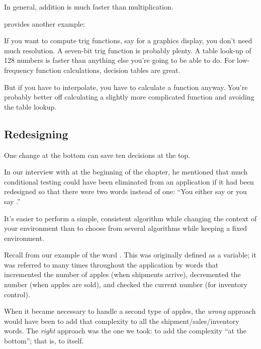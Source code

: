 In general, addition is much faster than multiplication.

\begin{interview}
 provides another example:
\begin{tfquot}
If you want to compute trig functions, say for a graphics display, you don't
need much resolution. A seven-bit trig function is probably plenty. A table
look-up of 128 numbers is faster than anything else you're going to be able
to do. For low-frequency function calculations, decision tables are great.

But if you have to interpolate, you have to calculate a function anyway.
You're probably better off calculating a slightly more complicated function
and avoiding the table lookup.
\end{tfquot}
\end{interview}%
%

\subsection{Redesigning}%
%

\begin{tip}
One change at the bottom can save ten decisions at the top.
\end{tip}
In our interview with  at the
beginning of the chapter, he mentioned that much conditional testing could
have been eliminated from an application if it had been redesigned so that
there were two words instead of one: ``You either say  or you
say .''

It's easier to perform a simple, consistent algorithm while changing
the context of your environment than to choose from several algorithms
while keeping a fixed environment.

Recall from  our example of the word . This was
originally defined as a variable; it was referred to many times throughout
the application by words that incremented the number of apples (when
shipments arrive), decremented the number (when apples are sold), and
checked the current number (for inventory control).

When it became necessary to handle a second type of apples, the
\emph{wrong} approach would have been to add that complexity to all
the shipment/\hy sales/\hy inventory words. The \emph{right} approach
was the one we took: to add the complexity ``at the bottom''; that is,
to  itself.

